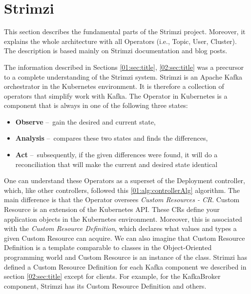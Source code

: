 \section{Strimzi}
\label{03:title}

This section describes the fundamental parts of the Strimzi project. Moreover, it explains the whole architecture with all Operators (i.e., Topic, User, Cluster). The description is based mainly on Strimzi documentation and blog posts\cite{strimziDoc, strimziBlogPosts}.

The information described in Sections \ref{01:sec:title}, \ref{02:sec:title} was a precursor to a complete understanding of the Strimzi system. Strimzi is an Apache Kafka orchestrator in the Kubernetes environment. It is therefore a collection of operators that simplify work with Kafka. The Operator in Kubernetes is a component that is always in one of the following three states:
\begin{itemize}[itemsep=1mm, parsep=0pt]
    \item \textbf{Observe} \---\ gain the desired and current state,
    \item \textbf{Analysis} \---\ compares these two states and finds the differences,
    \item \textbf{Act} \---\ subsequently, if the given differences were found, it will do a reconciliation that will make the current and desired state identical
\end{itemize}

One can understand these Operators as a superset of the Deployment controller, which, like other controllers, followed this \ref{01:alg:controllerAlg} algorithm. The main difference is that the Operator oversees \emph{Custom Resources - CR}. Custom Resource is an extension of the Kubernetes API. These CRs define your application objects in the Kubernetes environment. Moreover, this is associated with the \emph{Custom Resource Definition}, which declares what values and types a given Custom Resource can acquire. We can also imagine that Custom Resource Definition is a template comparable to classes in the Object-Oriented programming world and Custom Resource is an instance of the class. Strimzi has defined a Custom Resource Definition for each Kafka component we described in section \ref{02:sec:title} except for clients. For example, for the KafkaBroker component, Strimzi has its Custom Resource Definition and others. 

